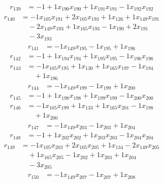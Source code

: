 \[\begin{aligned}
r_{139} &= - 1 + 1 x_{190} x_{190} + 1 x_{191} x_{191} - 1 x_{192} x_{192}
\end{aligned}\]
\[\begin{aligned}
r_{140} &= - 1 x_{105} x_{191} + 2 x_{105} x_{193} + 1 x_{126} + 1 x_{149} x_{191} \\
 &\quad - 2 x_{149} x_{193} + 1 x_{165} x_{193} - 1 x_{190} + 2 x_{191} \\
 &\quad - 3 x_{193}
\end{aligned}\]
\[\begin{aligned}
r_{141} &= - 1 x_{149} x_{195} - 1 x_{195} + 1 x_{196}
\end{aligned}\]
\[\begin{aligned}
r_{142} &= - 1 + 1 x_{194} x_{194} + 1 x_{195} x_{195} - 1 x_{196} x_{196}
\end{aligned}\]
\[\begin{aligned}
r_{143} &= - 1 x_{105} x_{195} + 1 x_{130} + 1 x_{165} x_{197} - 1 x_{194} \\
 &\quad + 1 x_{196}
\end{aligned}\]
\[\begin{aligned}
r_{144} &= - 1 x_{149} x_{199} - 1 x_{199} + 1 x_{200}
\end{aligned}\]
\[\begin{aligned}
r_{145} &= - 1 + 1 x_{198} x_{198} + 1 x_{199} x_{199} - 1 x_{200} x_{200}
\end{aligned}\]
\[\begin{aligned}
r_{146} &= - 1 x_{105} x_{199} + 1 x_{133} + 1 x_{165} x_{201} - 1 x_{198} \\
 &\quad + 1 x_{200}
\end{aligned}\]
\[\begin{aligned}
r_{147} &= - 1 x_{149} x_{203} - 1 x_{203} + 1 x_{204}
\end{aligned}\]
\[\begin{aligned}
r_{148} &= - 1 + 1 x_{202} x_{202} + 1 x_{203} x_{203} - 1 x_{204} x_{204}
\end{aligned}\]
\[\begin{aligned}
r_{149} &= - 1 x_{105} x_{203} + 2 x_{105} x_{205} + 1 x_{134} - 2 x_{149} x_{205} \\
 &\quad + 1 x_{165} x_{205} - 1 x_{202} + 1 x_{203} + 1 x_{204} \\
 &\quad - 3 x_{205}
\end{aligned}\]
\[\begin{aligned}
r_{150} &= - 1 x_{149} x_{207} - 1 x_{207} + 1 x_{208}
\end{aligned}\]
